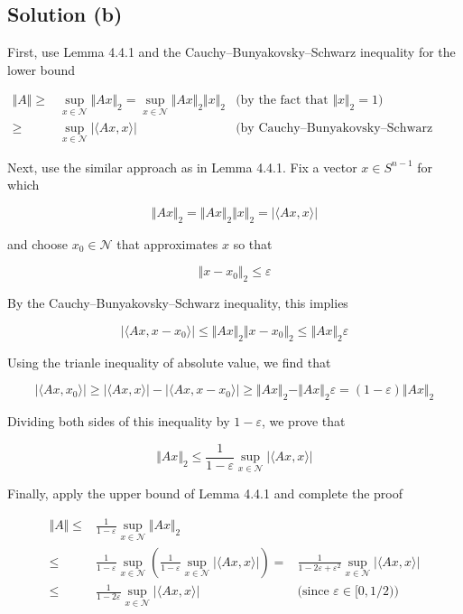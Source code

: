 \documentclass{article}
\begin{document}
\subsection{Solution (b)}

First, use Lemma 4.4.1 and the Cauchy–Bunyakovsky–Schwarz inequality for the lower bound

\begin{equation*}
    \begin{aligned}
        \Vert A \Vert \geq & \sup_{x \in \mathcal N} \Vert A x \Vert_2 = \sup_{x \in \mathcal N} \Vert Ax \Vert_2 \Vert x \Vert_2 &\text{(by the fact that $\Vert x \Vert_2 = 1$)} \\
        \geq & \sup_{x \in \mathcal N} | \langle Ax,  x \rangle | &\text{(by Cauchy–Bunyakovsky–Schwarz inequality)}
    \end{aligned}
\end{equation*}

Next, use the similar approach as in Lemma 4.4.1. Fix a vector $x \in S^{n-1}$ for which

$$\Vert Ax \Vert_2 = \Vert Ax \Vert_2 \Vert x \Vert_2 = |\langle Ax, x \rangle|$$

and choose $x_0 \in \mathcal N$ that approximates $x$ so that

$$\Vert x - x_0 \Vert_2 \leq \varepsilon$$

By the Cauchy–Bunyakovsky–Schwarz inequality, this implies

$$|\langle Ax, x - x_0 \rangle| \leq \Vert Ax \Vert_2 \Vert x - x_0 \Vert_2 \leq \Vert Ax \Vert_2 \varepsilon$$

Using the trianle inequality of absolute value, we find that

$$|\langle Ax, x_0 \rangle| \geq |\langle Ax, x \rangle| - |\langle Ax, x - x_0 \rangle| \geq \Vert Ax \Vert_2 - \Vert Ax \Vert_2 \varepsilon = (1 - \varepsilon) \Vert Ax \Vert_2$$

Dividing both sides of this inequality by $1 - \varepsilon$, we prove that

$$\Vert Ax \Vert_2 \leq \frac{1}{1-\varepsilon}\sup_{x \in \mathcal N}|\langle Ax, x \rangle|$$

Finally, apply the upper bound of Lemma 4.4.1 and complete the proof

\begin{equation*}
    \begin{aligned}
        \Vert A \Vert \leq & \frac{1}{1-\varepsilon}\sup_{x \in \mathcal N} \Vert Ax \Vert_2 \\ 
        \leq & \frac{1}{1-\varepsilon}\sup_{x \in \mathcal N} \left( \frac{1}{1-\varepsilon}\sup_{x \in \mathcal N}|\langle Ax, x \rangle|\right) = & \frac{1}{1-2\varepsilon+\varepsilon^2}\sup_{x \in \mathcal N}|\langle Ax, x \rangle| \\
        \leq & \frac{1}{1-2\varepsilon}\sup_{x \in \mathcal N}|\langle Ax, x \rangle| &\text{(since $\varepsilon \in [0,1/2)$)}
    \end{aligned}
\end{equation*}
\end{document}
